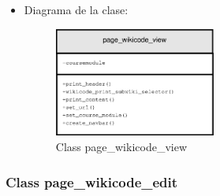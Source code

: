 \begin{itemize}
	\item Diagrama de la clase:
		\begin{figure}[h]
			\centering
			\includegraphics[width=0.5\textwidth]{./img/page_wikicode_view.eps}
			\caption{Class page\_wikicode\_view}
		\end{figure}
\end{itemize}

\subsubsection{Class page\_wikicode\_edit}

